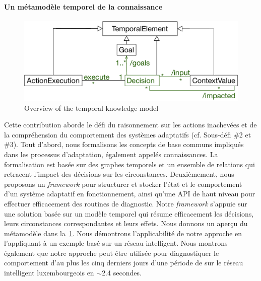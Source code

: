 \paragraph{Un métamodèle temporel de la connaissance}
\begin{figure}
	\centering
	\includegraphics[width=0.6\linewidth]{img/chapt-intro/approach/tkm-overview}
	\caption{Overview of the temporal knowledge model}
	\label{fig:french:contrib:tkm}
\end{figure}

%
Cette contribution aborde le défi du raisonnement sur les actions inachevées et de la compréhension du comportement des systèmes adaptatifs (cf. Sous-défi \#2 et \#3). 
Tout d'abord, nous formalisons les concepts de base communs impliqués dans les processus d'adaptation, également appelés connaissances. 
La formalisation est basée sur des graphes temporels et un ensemble de relations qui retracent l'impact des décisions sur les circonstances. 
Deuxièmement, nous proposons un \textit{framework} pour structurer et stocker l'état et le comportement d'un système adaptatif en fonctionnement, ainsi qu'une API de haut niveau pour effectuer efficacement des routines de diagnostic. 
Notre \textit{framework} s'appuie sur une solution basée sur un modèle temporel qui résume efficacement les décisions, leurs circonstances correspondantes et leurs effets. 
Nous donnons un aperçu du métamodèle dans la~\cref{fig:french:contrib:tkm}. 
Nous démontrons l'applicabilité de notre approche en l'appliquant à un exemple basé sur un réseau intelligent. 
Nous montrons également que notre approche peut être utilisée pour diagnostiquer le comportement d'au plus les cinq derniers jours d'une période de sur le réseau intelligent luxembourgeois en $\sim$2.4 secondes.

